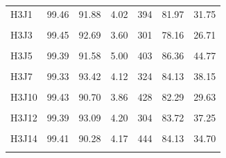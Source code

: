 \documentclass[
  a4paper,
  titlepage]{article}
\begin{document}
\begin{longtable}[t]{lllllll}
H3J1 & 99.46 & 91.88 & 4.02 & 394 & 81.97 & 31.75\\
 
\cellcolor{gray!6}{H3J2} & \cellcolor{gray!6}{99.38} & \cellcolor{gray!6}{89.65} & \cellcolor{gray!6}{4.25} & \cellcolor{gray!6}{431} & \cellcolor{gray!6}{80.97} & \cellcolor{gray!6}{31.57}\\
 
H3J3 & 99.45 & 92.69 & 3.60 & 301 & 78.16 & 26.71\\
 
\cellcolor{gray!6}{H3J4} & \cellcolor{gray!6}{99.40} & \cellcolor{gray!6}{90.95} & \cellcolor{gray!6}{4.19} & \cellcolor{gray!6}{398} & \cellcolor{gray!6}{78.66} & \cellcolor{gray!6}{30.58}\\
 
H3J5 & 99.39 & 91.58 & 5.00 & 403 & 86.36 & 44.77\\
 
\cellcolor{gray!6}{H3J6} & \cellcolor{gray!6}{99.43} & \cellcolor{gray!6}{90.16} & \cellcolor{gray!6}{4.53} & \cellcolor{gray!6}{430} & \cellcolor{gray!6}{83.58} & \cellcolor{gray!6}{37.02}\\
 
H3J7 & 99.33 & 93.42 & 4.12 & 324 & 84.13 & 38.15\\
 
\cellcolor{gray!6}{H3J8} & \cellcolor{gray!6}{99.46} & \cellcolor{gray!6}{91.87} & \cellcolor{gray!6}{4.00} & \cellcolor{gray!6}{381} & \cellcolor{gray!6}{80.25} & \cellcolor{gray!6}{30.63}\\
 
H3J10 & 99.43 & 90.70 & 3.86 & 428 & 82.29 & 29.63\\
 
\cellcolor{gray!6}{H3J11} & \cellcolor{gray!6}{99.43} & \cellcolor{gray!6}{91.44} & \cellcolor{gray!6}{3.93} & \cellcolor{gray!6}{413} & \cellcolor{gray!6}{81.10} & \cellcolor{gray!6}{31.10}\\
 
H3J12 & 99.39 & 93.09 & 4.20 & 304 & 83.72 & 37.25\\
 
\cellcolor{gray!6}{H3J13} & \cellcolor{gray!6}{99.43} & \cellcolor{gray!6}{91.97} & \cellcolor{gray!6}{4.02} & \cellcolor{gray!6}{392} & \cellcolor{gray!6}{81.35} & \cellcolor{gray!6}{32.38}\\
 
H3J14 & 99.41 & 90.28 & 4.17 & 444 & 84.13 & 34.70\\
 
\cellcolor{gray!6}{H3J15} & \cellcolor{gray!6}{99.45} & \cellcolor{gray!6}{91.47} & \cellcolor{gray!6}{3.94} & \cellcolor{gray!6}{421} & \cellcolor{gray!6}{84.19} & \cellcolor{gray!6}{33.28}\\
 

\end{longtable}
\end{document}
